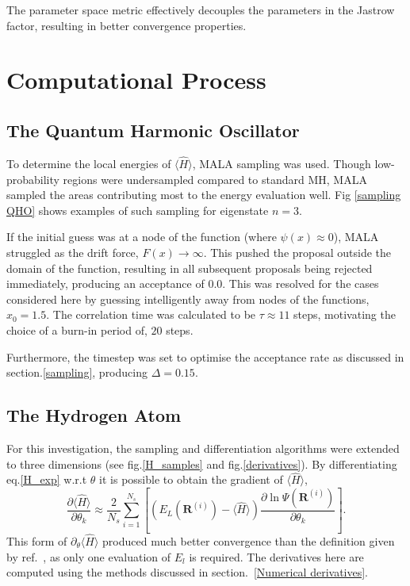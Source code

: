 \documentclass[journal,12pt]{Imperial_lab_report}
\begin{document}
        The parameter space metric effectively decouples the parameters in the Jastrow factor, resulting in better convergence properties. 
        

\section{Computational Process}    
    \subsection{The Quantum Harmonic Oscillator}      
        To determine the local energies of $\langle \hat{H} \rangle$, MALA sampling was used. Though low-probability regions were undersampled compared to standard MH, MALA sampled the areas contributing most to the energy evaluation well. Fig \ref{sampling QHO} shows examples of such sampling for eigenstate $n=3$. 
        
        If the initial guess was at a node of the function (where $\psi(x) \approx 0$), MALA struggled as the drift force, $F(x) \rightarrow \infty$. This pushed the proposal outside the domain of the function, resulting in all subsequent proposals being rejected immediately, producing an acceptance of $0.0$. This was resolved for the cases considered here by guessing intelligently away from nodes of the functions, $x_0=1.5$. The correlation time was calculated to be $\tau \approx 11$ steps, motivating the choice of a burn-in period of, $20$ steps.
        
        Furthermore, the timestep was set to optimise the acceptance rate as discussed in section.\ref{sampling}, producing $\Delta=0.15$.
        
    \subsection{The Hydrogen Atom}        
        For this investigation, the sampling and differentiation algorithms were extended to three dimensions (see fig.\ref{H_samples} and fig.\ref{derivatives}). By differentiating eq.\ref{H_exp} w.r.t $\theta$ it is possible to obtain the gradient of $\langle \hat{H} \rangle$,
        \begin{equation} \label{H_log_gradient}
            \frac{\partial \langle \hat{H} \rangle}{\partial \theta_k} \approx \frac{2}{N_s} \sum_{i=1}^{N_s} \left[ \left( E_L(\mathbf{R}^{(i)}) - \langle \hat{H} \rangle \right) \frac{\partial \ln \Psi(\mathbf{R}^{(i)})}{\partial \theta_k} \right].
        \end{equation}
        This form of $\partial_\theta \langle \hat{H} \rangle$ produced much better convergence than the definition given by ref.~\cite{scott_computational}, as only one evaluation of $E_l$ is required. The derivatives here are computed using the methods discussed in section.~\ref{Numerical derivatives}.
        
\end{document}
